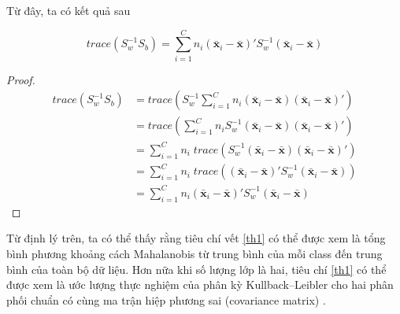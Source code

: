 Từ đây, ta có kết quả sau
\begin{DL}
	\begin{equation}\label{th1}
		trace(S_w^{-1}S_b) = \sum_{i=1}^Cn_i(\bar{\boldsymbol{x}}_i- \bar{\boldsymbol{x}})'S_w^{-1}(\bar{\boldsymbol{x}}_i- \bar{\boldsymbol{x}})
	\end{equation}
\end{DL}
\begin{proof}
	\begin{align*}\label{th1}
		trace(S_w^{-1}S_b) &= trace\left(S_w^{-1}\sum_{i=1}^Cn_i(\bar{\boldsymbol{x} }_i-\bar{\boldsymbol{x} })(\bar{\boldsymbol{x} }_i-\bar{\boldsymbol{x} })'\right)\\
		&= trace\left(\sum_{i=1}^Cn_iS_w^{-1}(\bar{\boldsymbol{x} }_i-\bar{\boldsymbol{x} })(\bar{\boldsymbol{x} }_i-\bar{\boldsymbol{x} })'\right)\\
		&= \sum_{i=1}^Cn_i\;trace\left(S_w^{-1}(\bar{\boldsymbol{x} }_i-\bar{\boldsymbol{x} })(\bar{\boldsymbol{x} }_i-\bar{\boldsymbol{x} })'\right)\\    
		&= \sum_{i=1}^Cn_i\;trace\left((\bar{\boldsymbol{x} }_i-\bar{\boldsymbol{x} })'S_w^{-1}(\bar{\boldsymbol{x} }_i-\bar{\boldsymbol{x} })\right)\\   
		&= \sum_{i=1}^Cn_i(\bar{\boldsymbol{x}}_i- \bar{\boldsymbol{x}})'S_w^{-1}(\bar{\boldsymbol{x}}_i- \bar{\boldsymbol{x}})
	\end{align*}
\end{proof}
Từ định lý trên, ta có thể thấy rằng tiêu chí vết \ref{th1} có thể được xem là tổng bình phương khoảng cách Mahalanobis từ trung bình của mỗi class đến trung bình của toàn bộ dữ liệu. Hơn nữa khi số lượng lớp là hai, tiêu chí \ref{th1} có thể được xem là ước lượng thực nghiệm của phân kỳ Kullback–Leibler cho hai phân phối chuẩn có cùng ma trận hiệp phương sai (covariance matrix) \cite{kong2014pairwise}. 

